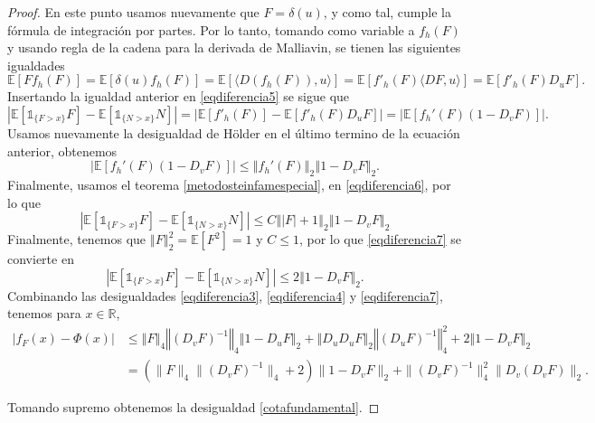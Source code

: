 \documentclass[letterpaper,twoside,12pt]{book}
\newcommand{\R}{\mathbb{R}}
\newcommand{\E}{\mathbb{E}}
\newcommand{\1}{\mathds{1}}
\newcommand{\abs}[1]{\left\lvert #1 \right\rvert}
\newcommand{\norm}[1]{\left\Vert #1 \right\Vert}
\theoremstyle{definition}
\theoremstyle{definition}
\theoremstyle{remark}
\theoremstyle{definition}
\theoremstyle{definition}
\theoremstyle{definition}
\theoremstyle{definition}
\theoremstyle{definition}
\begin{document}
\begin{proof}
En este punto usamos nuevamente que $F=\delta(u)$, y como tal, cumple la fórmula de integración por partes. Por lo tanto, tomando como variable a $f_h(F)$ y usando regla de la cadena para la derivada de Malliavin, se tienen las siguientes igualdades
\begin{equation*}
   \E\left[Ff_h(F)\right]=\E\left[\delta(u)f_h(F)\right]=\E\left[\langle D(f_h(F)),u\rangle\right]=\E\left[f'_h(F)\langle DF,u\rangle\right]=\E\left[f'_h(F)D_uF\right].
\end{equation*}
Insertando la igualdad anterior en \eqref{eqdiferencia5} se sigue que 
   \begin{equation*}
      \abs{\E\left[\1_{\{F>x\}}F\right]-\E\left[\1_{\{N>x\}}N\right]}=\abs{\E\left[f'_h(F)\right]-\E\left[f'_h(F)D_uF\right]}= \abs{\E\left[f_h'(F)(1-D_vF)\right]}.
   \end{equation*}
Usamos nuevamente la desigualdad de Hölder en el último termino de la ecuación anterior, obtenemos
\begin{equation}\label{eqdiferencia6}
   \abs{\E\left[f_h'(F)(1-D_vF)\right]}\leq \norm{f_h'(F)}_2\norm{1-D_vF}_2.
\end{equation}
Finalmente, usamos el teorema \ref{metodosteinfamespecial}, en \eqref{eqdiferencia6}, por lo que 
\begin{equation}\label{eqdiferencia7}
      \abs{\E\left[\1_{\{F>x\}}F\right]-\E\left[\1_{\{N>x\}}N\right]}\leq C\norm{\abs{F}+1}_2\norm{1-D_vF}_2
\end{equation}
Finalmente, tenemos que $\norm{F}_2^2 = \E\left[F^2\right] = 1$ y $C\leq 1$, por lo que \eqref{eqdiferencia7} se convierte en 
\begin{equation}\label{eqdiferencia8}
   \abs{\E\left[\1_{\{F>x\}}F\right]-\E\left[\1_{\{N>x\}}N\right]}\leq2\norm{1-D_vF}_2.
\end{equation}
Combinando las desigualdades \eqref{eqdiferencia3}, \eqref{eqdiferencia4} y \eqref{eqdiferencia7}, tenemos para $x\in \R$,
\begin{align*}
   \abs{f_F(x)-\Phi(x)}&\leq \norm{F}_4\norm{(D_vF)^{-1}}_4\norm{1-D_uF}_2+\norm{D_uD_uF}_2\norm{(D_uF)^{-1}}_4^{2}+2\norm{1-D_vF}_2\\
   &=\left(\|F\|_4\|\left(D_vF\right)^{-1}\|_4+2\right)\|1-D_vF\|_2+\|\left(D_vF\right)^{-1}\|_4^{2}\|D_v \left(D_vF\right)\|_2.   
\end{align*}

Tomando supremo obtenemos la desigualdad \eqref{cotafundamental}.
\end{proof}
\end{document}
